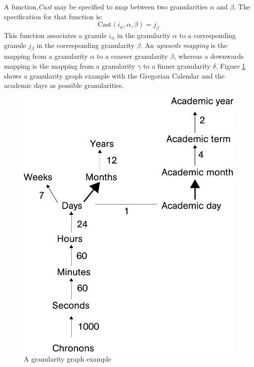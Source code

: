 A function,\emph{Cast} may be specified to map between two granularities $\alpha$ and $\beta$. The specification for that function is:
\begin{equation}
\label{eq:cast-function}
\mbox{Cast} \left( i_\alpha,\alpha,\beta \right) = j_\beta
\end{equation}
This function associates a granule $i_\alpha$ in the granularity $\alpha$ to a corresponding granule $j_\beta$ in the corresponding granularity $\beta$. An \emph{upwards mapping} is the mapping from a granularity $\alpha$ to a coarser granularity $\beta$, whereas a downwards mapping is the mapping from a granularity $\gamma$ to a finner granularity $\delta$. Figure \ref{fig:granularity-graph-example} shows a granularity graph example with the Gregorian Calendar and the academic days as possible granularities.

\begin{figure}
\centering
\includegraphics[scale=0.5]{graphs/granularityGraph.pdf}
\caption{A granularity graph example}
\label{fig:granularity-graph-example}
\end{figure}

